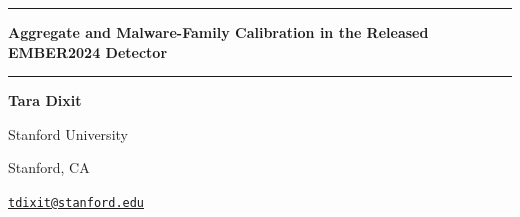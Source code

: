 \documentclass[11pt]{article}
\newcommand{\code}[1]{\texttt{#1}}
\begin{document}
\begin{center}
  \rule{\textwidth}{2.2pt}
  \vspace{0.18cm}

  {\Large\bfseries Aggregate and Malware-Family Calibration in the Released EMBER2024 Detector\par}

  \vspace{0.2cm}
  \rule{\textwidth}{0.7pt}
  \vspace{0.42cm}

  {\normalsize\bfseries Tara Dixit\par}
  \vspace{0.06cm}
  {\small Stanford University\par}
  {\small Stanford, CA\par}
  {\small\href{mailto:tdixit@stanford.edu}{\texttt{tdixit@stanford.edu}}\par}
\end{center}

\vspace{0.2cm}

\begin{center}
\begin{minipage}{0.78\textwidth}
\begin{abstract}
\small
The released EMBER2024 PE detector has strong overall scores, but aggregate
metrics may hide errors for specific malware families. I evaluated the released
LightGBM model on 540,000 PE records represented by 2,568 \code{thrember}
features. The data contain 360,000 Win32, 120,000 Win64, and 60,000 Dot\_Net
records. The released archives contained duplicated structural halves, so the
evaluation kept the first documented half of each weekly member. The selected
data have 539,940 unique hashes. Sixty hashes occur twice across member and week
boundaries, with no label, family, file-type, or detector-input conflicts. The
model reaches 0.9803222222 accuracy, 0.9981880554 ROC AUC, a 0.0147949965 Brier
score, 0.0030850838 expected calibration error (ECE), and 0.0277246070 maximum
calibration error (MCE) with 15 bins. These aggregate values are strong. Family
results are different. Among families with at least 100 malicious records,
\code{malicord} has a false-negative rate of 0.851852 and ECE of 0.602358.
\code{lazzzy} and \code{rugmi} also have false-negative rates above 0.61. The
family results are descriptive, not causal. They show that good aggregate
calibration can coexist with large errors in smaller groups.
\end{abstract}
\end{minipage}
\end{center}
\end{document}
